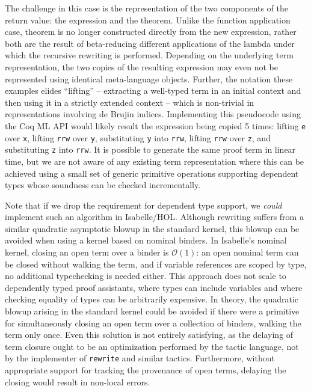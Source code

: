 \documentclass[sn-mathphys,pdflatex]{sn-jnl}%
\theoremstyle{thmstyleone}%
\theoremstyle{thmstyletwo}%
\theoremstyle{thmstylethree}%
\begin{document}
The challenge in this case is the representation of the two components of the return value: the expression and the theorem.
Unlike the function application case,  theorem is no longer constructed directly from the new expression, rather both are the result of beta-reducing different applications of the lambda under which the recursive rewriting is performed.
Depending on the underlying term representation, the two copies of the resulting expression may even not be represented using identical meta-language objects.
Further, the notation these examples elides ``lifting'' -- extracting a well-typed term in an initial context and then using it in a strictly extended context -- which is non-trivial in representations involving de Brujin indices.
Implementing this pseudocode using the Coq ML API would likely result the expression being copied 5 times: lifting \texttt{e} over \texttt{x}, lifting \texttt{rrw} over \texttt{y}, substituting \texttt{y} into \texttt{rrw}, lifting \texttt{rrw} over \texttt{z}, and substituting \texttt{z} into \texttt{rrw}.
It is possible to generate the same proof term in linear time, but we are not aware of any existing term representation where this can be achieved using a small set of generic primitive operations supporting dependent types whose soundness can be checked incrementally.

Note that if we drop the requirement for dependent type support, we \emph{could} implement such an algorithm in Isabelle/HOL.
Although rewriting suffers from a similar quadratic asymptotic blowup in the standard kernel, this blowup can be avoided when using a kernel based on nominal binders.
In Isabelle's nominal kernel, closing an open term over a binder is $\mathcal{O}(1)$:
an open nominal term can be closed without walking the term, and if variable references are scoped by type, no additional typechecking is needed either.
This approach does not scale to dependently typed proof assistants, where types can include variables and where checking equality of types can be arbitrarily expensive.
In theory, the quadratic blowup arising in the standard kernel could be avoided if there were a primitive for simultaneously closing an open term over a collection of binders, walking the term only once.
Even this solution is not entirely satisfying, as the delaying of term closure ought to be an optimization performed by the tactic language, not by the implementer of \texttt{rewrite} and similar tactics.
Furthermore, without appropriate support for tracking the provenance of open terms, delaying the closing would result in non-local errors.
\end{document}
